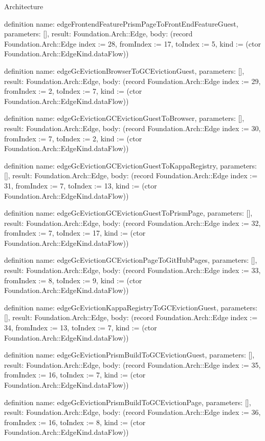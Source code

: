 \begin{lexlean}{Architecture}
\begin{semanticmodule}
definition{
  name: edgeFrontendFeaturePrismPageToFrontEndFeatureGuest,
  parameters: [],
  result: Foundation.Arch::Edge,
  body: (record Foundation.Arch::Edge {index := 28, fromIndex := 17, toIndex := 5, kind := (ctor Foundation.Arch::EdgeKind.dataFlow)})
}

definition{
  name: edgeGcEvictionBrowserToGCEvictionGuest,
  parameters: [],
  result: Foundation.Arch::Edge,
  body: (record Foundation.Arch::Edge {index := 29, fromIndex := 2, toIndex := 7, kind := (ctor Foundation.Arch::EdgeKind.dataFlow)})
}

definition{
  name: edgeGcEvictionGCEvictionGuestToBrowser,
  parameters: [],
  result: Foundation.Arch::Edge,
  body: (record Foundation.Arch::Edge {index := 30, fromIndex := 7, toIndex := 2, kind := (ctor Foundation.Arch::EdgeKind.dataFlow)})
}

definition{
  name: edgeGcEvictionGCEvictionGuestToKappaRegistry,
  parameters: [],
  result: Foundation.Arch::Edge,
  body: (record Foundation.Arch::Edge {index := 31, fromIndex := 7, toIndex := 13, kind := (ctor Foundation.Arch::EdgeKind.dataFlow)})
}

definition{
  name: edgeGcEvictionGCEvictionGuestToPrismPage,
  parameters: [],
  result: Foundation.Arch::Edge,
  body: (record Foundation.Arch::Edge {index := 32, fromIndex := 7, toIndex := 17, kind := (ctor Foundation.Arch::EdgeKind.dataFlow)})
}

definition{
  name: edgeGcEvictionGCEvictionPageToGitHubPages,
  parameters: [],
  result: Foundation.Arch::Edge,
  body: (record Foundation.Arch::Edge {index := 33, fromIndex := 8, toIndex := 9, kind := (ctor Foundation.Arch::EdgeKind.dataFlow)})
}

definition{
  name: edgeGcEvictionKappaRegistryToGCEvictionGuest,
  parameters: [],
  result: Foundation.Arch::Edge,
  body: (record Foundation.Arch::Edge {index := 34, fromIndex := 13, toIndex := 7, kind := (ctor Foundation.Arch::EdgeKind.dataFlow)})
}

definition{
  name: edgeGcEvictionPrismBuildToGCEvictionGuest,
  parameters: [],
  result: Foundation.Arch::Edge,
  body: (record Foundation.Arch::Edge {index := 35, fromIndex := 16, toIndex := 7, kind := (ctor Foundation.Arch::EdgeKind.dataFlow)})
}

definition{
  name: edgeGcEvictionPrismBuildToGCEvictionPage,
  parameters: [],
  result: Foundation.Arch::Edge,
  body: (record Foundation.Arch::Edge {index := 36, fromIndex := 16, toIndex := 8, kind := (ctor Foundation.Arch::EdgeKind.dataFlow)})
}


\end{semanticmodule}
\end{lexlean}
